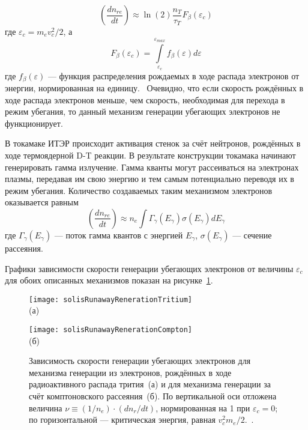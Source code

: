 \begin{equation*}
  \left( \frac{ d n_{re} }{ d t } \right) \approx \ln(2) \frac{ n_T }{ \tau_T } F_{\beta}(\varepsilon_c)
\end{equation*}
где $\varepsilon_c = m_e v_c^2 / 2$, а 
\begin{equation*}
  F_{\beta}(\varepsilon_c) = \int\limits_{\varepsilon_c}^{ \varepsilon_{max} } f_{\beta}(\varepsilon) d\varepsilon 
\end{equation*}
где $ f_{\beta}(\varepsilon) $ --- функция распределения рождаемых в ходе распада электронов от энергии, нормированная на единицу.~\cite{MartinSolis2017} Очевидно, что если скорость рождённых в ходе распада электронов меньше, чем скорость, необходимая для перехода в режим убегания, то данный механизм генерации убегающих электронов не функционирует.

В токамаке ИТЭР происходит активация стенок за счёт нейтронов, рождённых в ходе термоядерной D-T реакции. В результате конструкции токамака начинают генерировать гамма излучение. Гамма кванты могут рассеиваться на электронах плазмы, передавая им свою энергию и тем самым потенциально переводя их в режим убегания. Количество создаваемых таким механизмом электронов оказывается равным 
\begin{equation*}
  \left( \frac{ d n_{re} }{ d t } \right) \approx n_e \int \Gamma_{\gamma}(E_{\gamma}) \sigma(E_{\gamma}) d E_{\gamma} 
\end{equation*}
где $\Gamma_{\gamma}(E_{\gamma})$ --- поток гамма квантов с энергией $E_{\gamma}$, $\sigma(E_{\gamma})$ --- сечение рассеяния.~\cite{MartinSolis2017}

Графики зависимости скорости генерации убегающих электронов от величины $\varepsilon_c$ для обоих описанных механизмов показан на рисунке~\ref{fig:solisGeneration}.

\begin{figure}[ht]
    \begin{minipage}[b][][b]{0.49\linewidth}\centering
      \texttt{[image: solisRunawayRenerationTritium]} \\ (а)
    \end{minipage}
    \hfill
    \begin{minipage}[b][][b]{0.49\linewidth}\centering
      \texttt{[image: solisRunawayRenerationCompton]} \\ (б)
    \end{minipage}
    \caption{ Зависимость скорости генерации убегающих электронов для механизма генерации из электронов, рождённых в ходе радиоактивного распада трития~(а) и для механизма генерации за счёт комптоновского рассеяния~(б). По вертикальной оси отложена величина $\nu \equiv (1/n_e) \cdot ( dn_r / dt ) $, нормированная на 1 при $\varepsilon_c = 0$; по горизонтальной --- критическая энергия, равная $v_c^2 m_e / 2 $.~\cite{MartinSolis2017}. }
    \label{fig:solisGeneration}
\end{figure}


